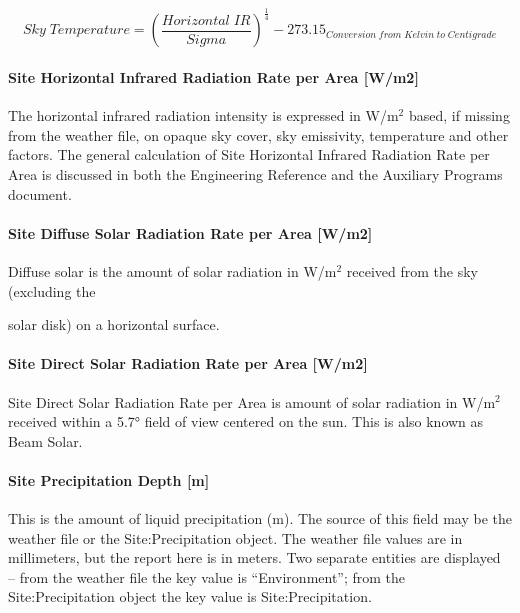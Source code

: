 \begin{equation}
Sky\;Temperature = {\left( {\frac{{Horizontal\;IR}}{{Sigma}}} \right)^{\frac{1}{4}}} - {273.15_{Conversion\;from\;Kelvin\;to\;Centigrade}}
\end{equation}

\paragraph{Site Horizontal Infrared Radiation Rate per Area {[}W/m2{]}}\label{site-horizontal-infrared-radiation-rate-per-area-wm2}

The horizontal infrared radiation intensity is expressed in W/m\(^{2}\) based, if missing from the weather file, on opaque sky cover, sky emissivity, temperature and other factors. The general calculation of Site Horizontal Infrared Radiation Rate per Area is discussed in both the Engineering Reference and the Auxiliary Programs document.

\paragraph{Site Diffuse Solar Radiation Rate per Area {[}W/m2{]}}\label{site-diffuse-solar-radiation-rate-per-area-wm2}

Diffuse solar is the amount of solar radiation in W/m\(^{2}\) received from the sky (excluding the

solar disk) on a horizontal surface.

\paragraph{Site Direct Solar Radiation Rate per Area {[}W/m2{]}}\label{site-direct-solar-radiation-rate-per-area-wm2}

Site Direct Solar Radiation Rate per Area is amount of solar radiation in W/m\(^{2}\) received within a 5.7° field of view centered on the sun. This is also known as Beam Solar.

\paragraph{Site Precipitation Depth {[}m{]}}\label{site-precipitation-depth-m}

This is the amount of liquid precipitation (m). The source of this field may be the weather file or the Site:Precipitation object. The weather file values are in millimeters, but the report here is in meters. Two separate entities are displayed -- from the weather file the key value is ``Environment''; from the Site:Precipitation object the key value is Site:Precipitation.

